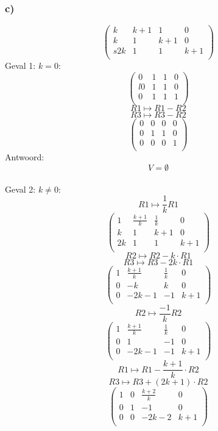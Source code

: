 \documentclass[lineaire_algebra_oplossingen.tex]{subfiles}
\begin{document}
\subsubsection*{c)}
\[
\begin{pmatrix}
k & k+1 & 1 & 0\\
k & 1 & k+1 & 0\\s
2k & 1 & 1 & k+1\\
\end{pmatrix}
\]
Geval 1: $k=0$:
\[
\begin{pmatrix}
0 & 1 & 1 & 0\\l
0 & 1 & 1 & 0\\
0 & 1 & 1 & 1\\
\end{pmatrix}
\]
\[ R1 \longmapsto R1 - R2 \]
\[ R3 \longmapsto R3 - R2 \]
\[
\begin{pmatrix}
0 & 0 & 0 & 0\\
0 & 1 & 1 & 0\\
0 & 0 & 0 & 1\\
\end{pmatrix}
\]
Antwoord:
\[
V=\emptyset
\]\\
Geval 2: $k\neq0$:
\[ R1 \longmapsto \frac{1}{k}R1 \]
\[
\begin{pmatrix}
1 & \frac{k+1}{k} & \frac{1}{k} & 0\\
k & 1 & k+1 & 0\\
2k & 1 & 1 & k+1\\
\end{pmatrix}
\]
\[ R2 \longmapsto R2 - k\cdot R1 \]
\[ R3 \longmapsto R3 - 2k\cdot R1 \]
\[
\begin{pmatrix}
1 & \frac{k+1}{k} & \frac{1}{k} & 0\\
0 & -k & k & 0\\
0 & -2k-1 & -1 & k+1\\
\end{pmatrix}
\]
\[ R2 \longmapsto \frac{-1}{k}R2\]
\[
\begin{pmatrix}
1 & \frac{k+1}{k} & \frac{1}{k} & 0\\
0 & 1 & -1 & 0\\
0 & -2k-1 & -1 & k+1\\
\end{pmatrix}
\]
\[ R1 \longmapsto R1 - \frac{k+1}{k}\cdot R2 \]
\[ R3 \longmapsto R3 + (2k+1)\cdot R2 \]
\[
\begin{pmatrix}
1 & 0 & \frac{k+2}{k} & 0\\
0 & 1 & -1 & 0\\
0 & 0 & -2k-2 & k+1\\
\end{pmatrix}
\]
\end{document}
